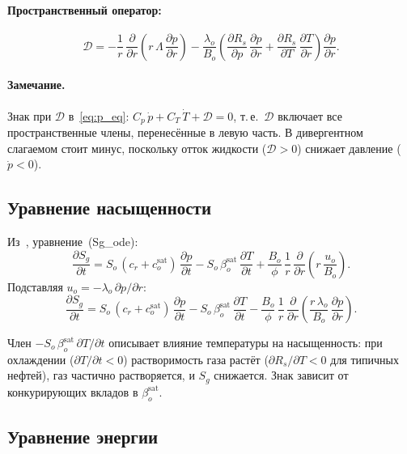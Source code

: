 \documentclass[12pt,a4paper]{article}
\newcommand{\pp}{\partial}
\newcommand{\sat}{\mathrm{sat}}
\begin{document}
\paragraph{Пространственный оператор:}
\begin{equation}\label{eq:D_operator}
  \mathcal{D} = -\frac{1}{r}\,\frac{\pp}{\pp r}\!\left(
      r\,\Lambda\,\frac{\pp p}{\pp r}
    \right)
    - \frac{\lambda_o}{B_o}\!\left(
      \frac{\pp R_s}{\pp p}\,\frac{\pp p}{\pp r}
      + \frac{\pp R_s}{\pp T}\,\frac{\pp T}{\pp r}
    \right)\frac{\pp p}{\pp r}.
\end{equation}

\paragraph{Замечание.}
Знак при $\mathcal{D}$ в~\eqref{eq:p_eq}: $C_p\,\dot{p} + C_T\,\dot{T}
+ \mathcal{D} = 0$, т.\,е.\ $\mathcal{D}$ включает все
пространственные члены, перенесённые в левую часть.
В дивергентном слагаемом стоит минус, поскольку отток жидкости
($\mathcal{D} > 0$) снижает давление ($\dot{p} < 0$).


\subsection{Уравнение насыщенности}

Из~\cite{draft4}, уравнение~(Sg\_ode):
\begin{equation}\label{eq:Sg_eq}
  \boxed{
    \frac{\pp S_g}{\pp t}
    = S_o\,(c_r + c_o^\sat)\,\frac{\pp p}{\pp t}
      - S_o\,\beta_o^\sat\,\frac{\pp T}{\pp t}
      + \frac{B_o}{\phi}\,\frac{1}{r}\,\frac{\pp}{\pp r}\!
        \left(r\,\frac{u_o}{B_o}\right).
  }
\end{equation}
Подставляя $u_o = -\lambda_o\,\pp p/\pp r$:
\begin{equation}\label{eq:Sg_eq2}
  \frac{\pp S_g}{\pp t}
  = S_o\,(c_r + c_o^\sat)\,\frac{\pp p}{\pp t}
    - S_o\,\beta_o^\sat\,\frac{\pp T}{\pp t}
    - \frac{B_o}{\phi}\,\frac{1}{r}\,\frac{\pp}{\pp r}\!
      \left(\frac{r\,\lambda_o}{B_o}\,\frac{\pp p}{\pp r}\right).
\end{equation}

Член $-S_o\,\beta_o^\sat\,\pp T/\pp t$ описывает влияние
температуры на насыщенность: при охлаждении ($\pp T/\pp t < 0$)
растворимость газа растёт ($\pp R_s/\pp T < 0$ для типичных нефтей),
газ частично растворяется, и $S_g$ снижается. Знак зависит
от конкурирующих вкладов в $\beta_o^\sat$.


\subsection{Уравнение энергии}
\end{document}
